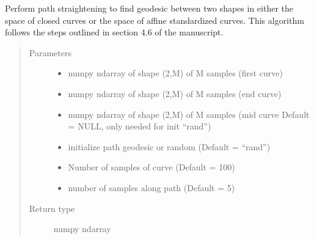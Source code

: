 \documentclass[letterpaper,10pt,english]{sphinxmanual}
\begin{document}

\begin{fulllineitems}
\label{\detokenize{geodesic:geodesic.path_straightening}}
Perform path straightening to find geodesic between two shapes in either
the space of closed curves or the space of affine standardized curves.
This algorithm follows the steps outlined in section 4.6 of the
manuscript.
\begin{quote}\begin{description}
\item[{Parameters}] \leavevmode\begin{itemize}
\item {} 
 \textendash{} numpy ndarray of shape (2,M) of M samples (first curve)

\item {} 
 \textendash{} numpy ndarray of shape (2,M) of M samples (end curve)

\item {} 
 \textendash{} numpy ndarray of shape (2,M) of M samples (mid curve
Default = NULL, only needed for init “rand”)

\item {} 
 \textendash{} initialize path geodesic or random (Default = “rand”)

\item {} 
 \textendash{} Number of samples of curve (Default = 100)

\item {} 
 \textendash{} number of samples along path (Default = 5)

\end{itemize}

\item[{Return type}] \leavevmode
numpy ndarray


\end{description}
\end{quote}
\end{fulllineitems}
\end{document}
